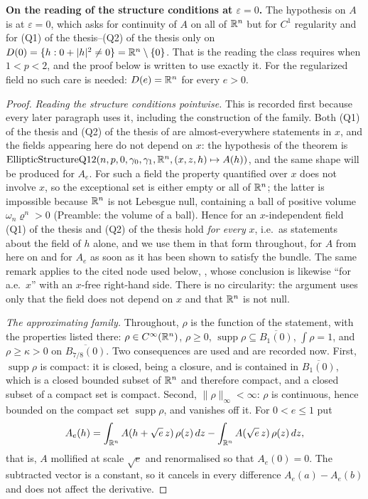 \begin{helper}
\textbf{On the reading of the structure conditions at $\varepsilon=0$.}  The
hypothesis on $A$ is  at $\varepsilon=0$, which
asks for continuity of $A$ on all of $\mathbb{R}^n$ but for $C^1$ regularity and for
(Q1) of the thesis--(Q2) of the thesis only on $D(0)=\{h:0+|h|^2\ne0\}=\mathbb{R}^n\setminus\{0\}$.
That is the reading the class requires when $1<p<2$, and the proof below is
written to use exactly it.  For the regularized field no such care is needed:
$D(e)=\mathbb{R}^n$ for every $e>0$.
\end{helper}
\begin{proof}
\emph{Reading the structure conditions pointwise.}  This is recorded first
because every later paragraph uses it, including the construction of the family.
Both (Q1) of the thesis and (Q2) of the thesis of  are
almost-everywhere statements in $x$, and the fields appearing here do not depend
on $x$: the hypothesis of the theorem is
$\mathrm{EllipticStructureQ12}(n,p,0,\gamma_0,\gamma_1,\mathbb{R}^n,(x,z,h)\mapsto A(h))$,
and the same shape will be produced for $A_e$.  For such a field the property
quantified over $x$ does not involve $x$, so the exceptional set is either empty
or all of $\mathbb{R}^n$; the latter is impossible because $\mathbb{R}^n$ is not Lebesgue null,
containing a ball of positive volume $\omega_n\varrho^n>0$ (Preamble: the volume of
a ball).  Hence for an $x$-independent field (Q1) of the thesis and (Q2) of the thesis
hold \emph{for every} $x$, i.e.\ as statements about the field of $h$ alone, and
we use them in that form throughout, for $A$ from here on and for $A_e$ as soon
as it has been shown to satisfy the bundle.  The same remark applies to the cited
node used below, , whose conclusion is
likewise ``for a.e.\ $x$'' with an $x$-free right-hand side.  There is no circularity: the argument uses only
that the field does not depend on $x$ and that $\mathbb{R}^n$ is not null.

\emph{The approximating family.}  Throughout, $\rho$ is the function of the
statement, with the properties listed there: $\rho\in C^\infty(\mathbb{R}^n)$,
$\rho\ge0$, $\operatorname{supp}\rho\subseteq\overline{B_1(0)}$,
$\int\rho=1$, and $\rho\ge\kappa>0$ on $\overline{B_{7/8}(0)}$.  Two
consequences are used and are recorded now.  First,
$\operatorname{supp}\rho$ is compact: it is closed, being a closure, and is
contained in $\overline{B_1(0)}$, which is a closed bounded subset of $\mathbb{R}^n$
and therefore compact, and a closed subset of a compact set is compact.  Second,
$\|\rho\|_\infty<\infty$: $\rho$ is continuous, hence bounded on the compact
set $\operatorname{supp}\rho$, and vanishes off it.  For $0<e\le1$ put
\[
A_e(h)=\int_{\mathbb{R}^n}A(h+\sqrt e\,z)\,\rho(z)\,dz
-\int_{\mathbb{R}^n}A(\sqrt e\,z)\,\rho(z)\,dz ,
\]
that is, $A$ mollified at scale $\sqrt e$ and renormalised so that $A_e(0)=0$.
The subtracted vector is a constant, so it cancels in every difference
$A_e(a)-A_e(b)$ and does not affect the derivative.


\end{proof}
